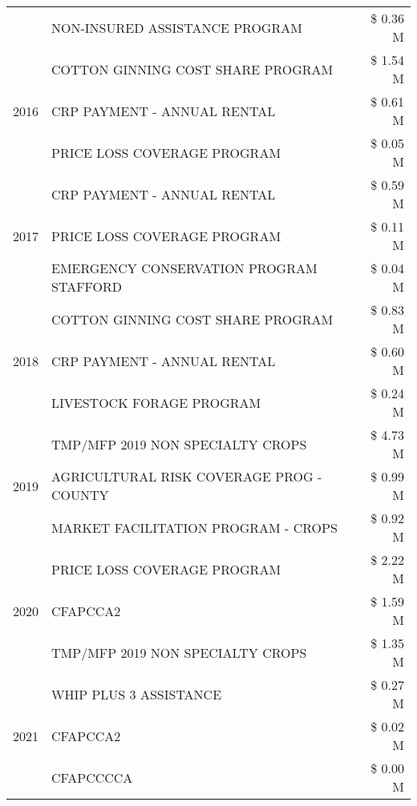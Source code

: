 \begin{tabular}{llr}
 & NON-INSURED ASSISTANCE PROGRAM & \$ 0.36 M \\
\cline{1-3}
\multirow[t]{3}{*}{2016} & COTTON GINNING COST SHARE PROGRAM & \$ 1.54 M \\
 & CRP PAYMENT - ANNUAL RENTAL & \$ 0.61 M \\
 & PRICE LOSS COVERAGE PROGRAM & \$ 0.05 M \\
\cline{1-3}
\multirow[t]{3}{*}{2017} & CRP PAYMENT - ANNUAL RENTAL & \$ 0.59 M \\
 & PRICE LOSS COVERAGE PROGRAM & \$ 0.11 M \\
 & EMERGENCY CONSERVATION PROGRAM STAFFORD & \$ 0.04 M \\
\cline{1-3}
\multirow[t]{3}{*}{2018} & COTTON GINNING COST SHARE PROGRAM & \$ 0.83 M \\
 & CRP PAYMENT - ANNUAL RENTAL & \$ 0.60 M \\
 & LIVESTOCK FORAGE PROGRAM & \$ 0.24 M \\
\cline{1-3}
\multirow[t]{3}{*}{2019} & TMP/MFP 2019 NON SPECIALTY CROPS & \$ 4.73 M \\
 & AGRICULTURAL RISK COVERAGE PROG - COUNTY & \$ 0.99 M \\
 & MARKET FACILITATION PROGRAM - CROPS & \$ 0.92 M \\
\cline{1-3}
\multirow[t]{3}{*}{2020} & PRICE LOSS COVERAGE PROGRAM & \$ 2.22 M \\
 & CFAPCCA2 & \$ 1.59 M \\
 & TMP/MFP 2019 NON SPECIALTY CROPS & \$ 1.35 M \\
\cline{1-3}
\multirow[t]{3}{*}{2021} & WHIP PLUS 3 ASSISTANCE & \$ 0.27 M \\
 & CFAPCCA2 & \$ 0.02 M \\
 & CFAPCCCCA & \$ 0.00 M \\
\cline{1-3}
\bottomrule
\end{tabular}
